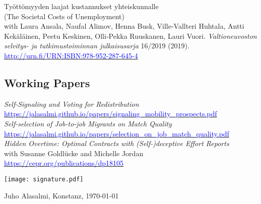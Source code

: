 \documentclass[16pt]{article}
\begin{document}
\noindent Ty\"{o}tt\"{o}myyden laajat kustannukset yhteiskunnalle \\
\noindent (The Societal Costs of Unemployment) \\
\noindent with Laura Ansala, Naufal Alimov, Henna Busk, Ville-Vallteri Huhtala, Antti Kek\"{a}l\"{a}inen, Peetu Keskinen, Olli-Pekka Ruuskanen, Lauri Vuori.  \textit{Valtioneuvoston selvitys- ja tutkimustoiminnan julkaisusarja} 16/2019 (2019).  \\
\noindent \href{http://urn.fi/URN:ISBN:978-952-287-645-4}{\textcolor{blue}{http://urn.fi/URN:ISBN:978-952-287-645-4}} \\


\subsection*{Working Papers}

\noindent \textit{Self-Signaling and Voting for Redistribution} \\ \href{https://jalasalmi.github.io/papers/signaling\_mobility\_prospects.pdf}{\textcolor{blue}{https://jalasalmi.github.io/papers/signaling\_mobility\_prospects.pdf}} \\

\noindent \textit{Self-selection of Job-to-job Migrants on Match Quality} \\ \href{https://jalasalmi.github.io/papers/selection\_on\_job\_match\_quality.pdf}{\textcolor{blue}{https://jalasalmi.github.io/papers/selection\_on\_job\_match\_quality.pdf}} \\

\noindent \textit{Hidden Overtime: Optimal Contracts with (Self-)deceptive Effort Reports} \\
with Susanne Goldlücke and Michelle Jordan \\  \href{https://cepr.org/publications/dp18105}{\textcolor{blue}{https://cepr.org/publications/dp18105}} 

%
%
%
\vfill


\texttt{[image: signature.pdf]} 


Juho Alasalmi, Konstanz, \today
\end{document}
